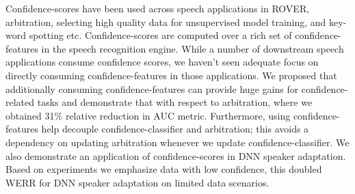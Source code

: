 Confidence-scores have been used across speech applications in ROVER, arbitration, selecting high quality data for unsupervised model training, and key-word spotting etc. Confidence-scores are computed over a rich set of confidence-features in the speech recognition engine. While a number of downstream speech applications consume confidence scores, we haven't seen adequate focus on directly consuming confidence-features in those applications. We proposed that additionally consuming confidence-features can provide huge gains for confidence-related tasks and demonstrate that with respect to arbitration, where we obtained 31\% relative reduction in AUC metric. Furthermore, using confidence-features help decouple confidence-classifier and arbitration; this avoids a dependency on updating arbitration whenever we update confidence-classifier. We also demonstrate an application of confidence-scores in DNN speaker adaptation. Based on experiments we emphasize data with low confidence, this doubled WERR for DNN speaker adaptation on limited data scenarios.

%










